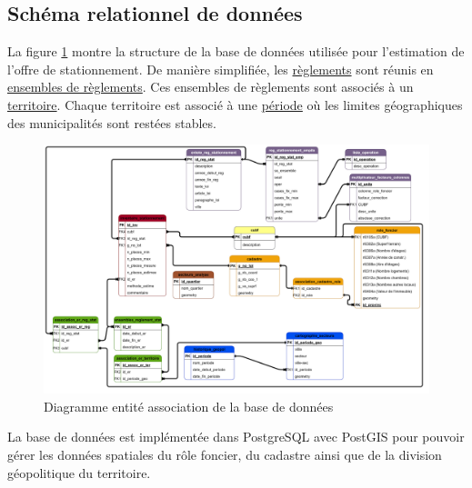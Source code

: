     \subsection{Schéma relationnel de données}
        La figure \ref{fig:offstreet_db_erd} montre la structure de la base de données utilisée pour l'estimation de l'offre de stationnement. De manière simplifiée, les \underline{règlements} sont réunis en \underline{ensembles de règlements}. Ces ensembles de règlements sont associés à un \underline{territoire}. Chaque territoire est associé à une \underline{période} où les limites géographiques des municipalités sont restées stables.
        \begin{landscape}
        \begin{figure}
            \centering
            \includegraphics[width = 0.85\linewidth]{dia/ERD_stationnement_propre.png}
            \caption{Diagramme entité association de la base de données}\label{fig:offstreet_db_erd}
        \end{figure}
        \end{landscape}
        La base de données est implémentée dans PostgreSQL avec PostGIS pour pouvoir gérer les données spatiales du rôle foncier, du cadastre ainsi que de la division géopolitique du territoire.\par
